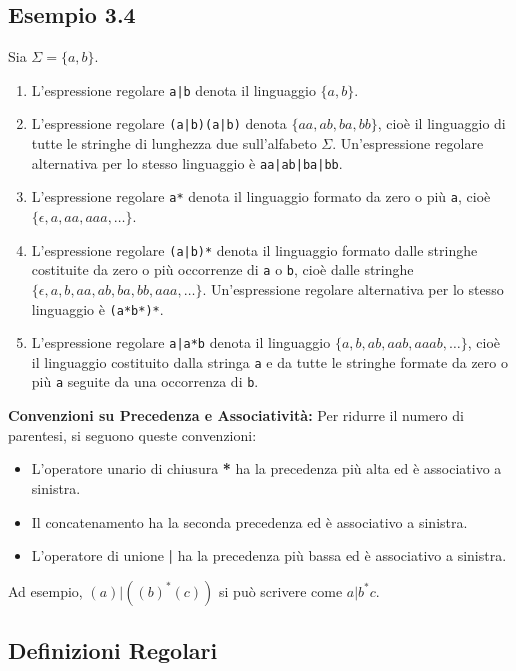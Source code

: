 \subsection*{Esempio 3.4}
Sia $\Sigma = \{a, b\}$.
\begin{enumerate}
    \item L'espressione regolare \texttt{a|b} denota il linguaggio $\{a, b\}$.

    \item L'espressione regolare \texttt{(a|b)(a|b)} denota $\{aa, ab, ba, bb\}$, cioè il linguaggio di tutte le stringhe di lunghezza due sull'alfabeto $\Sigma$. Un'espressione regolare alternativa per lo stesso linguaggio è \texttt{aa|ab|ba|bb}.

    \item L'espressione regolare \texttt{a*} denota il linguaggio formato da zero o più \texttt{a}, cioè $\{\epsilon, a, aa, aaa, \dots\}$.

    \item L'espressione regolare \texttt{(a|b)*} denota il linguaggio formato dalle stringhe costituite da zero o più occorrenze di \texttt{a} o \texttt{b}, cioè dalle stringhe $\{\epsilon, a, b, aa, ab, ba, bb, aaa, \dots\}$. Un'espressione regolare alternativa per lo stesso linguaggio è \texttt{(a*b*)*}.

    \item L'espressione regolare \texttt{a|a*b} denota il linguaggio $\{a, b, ab, aab, aaab, \dots\}$, cioè il linguaggio costituito dalla stringa \texttt{a} e da tutte le stringhe formate da zero o più \texttt{a} seguite da una occorrenza di \texttt{b}.
\end{enumerate}

\textbf{Convenzioni su Precedenza e Associatività:}
Per ridurre il numero di parentesi, si seguono queste convenzioni:
\begin{itemize}
    \item L'operatore unario di chiusura \textbf{*} ha la precedenza più alta ed è associativo a sinistra.
    \item Il concatenamento ha la seconda precedenza ed è associativo a sinistra.
    \item L'operatore di unione \textbf{|} ha la precedenza più bassa ed è associativo a sinistra.
\end{itemize}
Ad esempio, $(a)|((b)^*(c))$ si può scrivere come $a|b^*c$.

\subsection{Definizioni Regolari}

